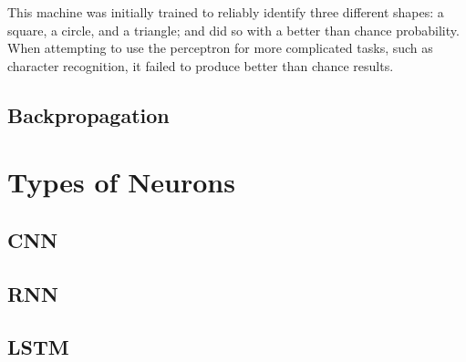This machine was initially trained to reliably identify three different shapes:
a square, a circle, and a triangle; and did so with a better than chance
probability.
When attempting to use the perceptron for more complicated tasks, such as
character recognition, it failed to produce better than chance results.


\subsection{Backpropagation}


\section{Types of Neurons}


\subsection{CNN}
\subsection{RNN}
\subsection{LSTM}
